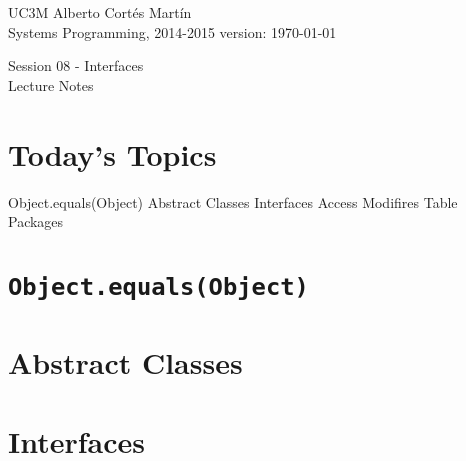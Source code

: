 \documentclass[a4paper, 9pt]{extarticle}
\newcommand{\realtitle}{Session 08 - Interfaces}
\begin{document}
\makebox[\linewidth]{\rule{\textwidth}{0.4pt}}
UC3M \hfill Alberto Cortés Martín\\
Systems Programming, 2014-2015 \hfill version: \today\\
\makebox[\linewidth]{\rule{\textwidth}{0.4pt}}
\begin{center}
  \Large{\realtitle}\\Lecture Notes
\end{center}
\makebox[\linewidth]{\rule{\textwidth}{0.4pt}}
\vspace{1cm}


\section{Today's Topics}
\begin{blackboard}
Object.equals(Object)
Abstract Classes
Interfaces
Access Modifires Table
Packages
\end{blackboard}


\section{\texttt{Object.equals(Object)}}

\section{Abstract Classes}

\section{Interfaces}
\end{document}
